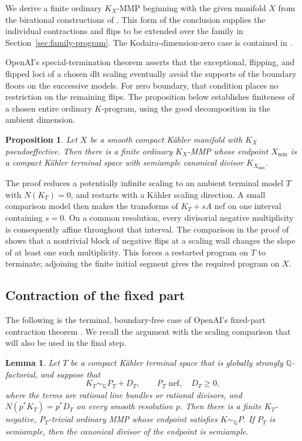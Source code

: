 \documentclass[11pt,a4paper]{article}
\newtheorem{lemma}[theorem]{Lemma}
\newtheorem{proposition}[theorem]{Proposition}
\theoremstyle{definition}\newtheorem{definition}[theorem]{Definition}
\theoremstyle{remark}\newtheorem*{remark}{Remark}
\newcommand{\Q}{\mathbb Q}\newcommand{\C}{\mathbb C}
\begin{document}
We derive a finite ordinary $K_X$-MMP beginning with the given
manifold $X$ from the birational constructions of \cite{OAI034}.
This form of the conclusion supplies the individual contractions and
flips to be extended over the family in Section~\ref{sec:family-program}.
The Kodaira-dimension-zero case is contained in
\cite[Corollary~3.10]{OAI034}.

OpenAI's special-termination theorem
\cite[Theorem~3.13]{OAI034} asserts that the exceptional, flipping,
and flipped loci of a chosen dlt scaling eventually avoid the supports
of the boundary floors on the successive models. For zero boundary,
that condition places no restriction on
the remaining flips. The proposition below establishes finiteness of a
chosen entire ordinary $K$-program, using the good decomposition
\cite[Theorem~2.13]{OAI034} in the ambient dimension.

\begin{proposition}\label{prop:finite-original}
Let $X$ be a smooth compact Kähler manifold with $K_X$ pseudoeffective.
Then there is a finite ordinary $K_X$-MMP whose endpoint $X_{\min}$ is a
compact Kähler terminal space with semiample canonical divisor
$K_{X_{\min}}$.
\end{proposition}

The proof reduces a potentially infinite scaling to an ambient terminal
model $T$ with $N(K_T)=0$, and restarts with a Kähler scaling direction.
A small comparison model then makes the transforms of
$K_T+sA$ nef on one interval containing $s=0$. On a common resolution,
every divisorial negative multiplicity is consequently affine throughout
that interval. The comparison in the proof of
\cite[Theorem~3.13]{OAI034} shows that a nontrivial block of negative flips
at a scaling wall changes the slope of at least one such multiplicity.
This forces a restarted
program on $T$ to terminate; adjoining the finite initial segment gives
the required program on $X$.

\subsection{Contraction of the fixed part}

The following is the terminal, boundary-free case of OpenAI's fixed-part
contraction theorem \cite[Proposition~3.8]{OAI034}. We recall the argument
with the scaling comparison that will also be used in the final step.

\begin{lemma}\label{lem:contract-fixed}
Let $T$ be a compact Kähler terminal space that is globally strongly
$\Q$-factorial, and suppose that
\[
 K_T\sim_\Q P_T+D_T,\qquad P_T\text{ nef},\quad D_T\ge0,
\]
where the terms are rational line bundles or rational divisors, and
$N(p^*K_T)=p^*D_T$ on every smooth resolution $p$. Then there is a finite
$K_T$-negative, $P_T$-trivial ordinary MMP whose endpoint satisfies
$K\sim_\Q P$.
If $P_T$ is semiample, then the canonical divisor of the endpoint is semiample.
\end{lemma}
\end{document}
